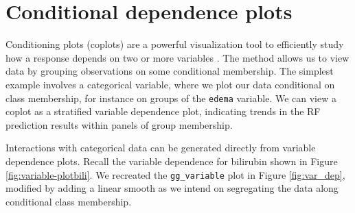 \documentclass[article]{jss}
\begin{document}
\section{Conditional dependence
plots}\label{conditional-dependence-plots}

Conditioning plots (coplots) \citep{chambers:1992,cleveland:1993} are a
powerful visualization tool to efficiently study how a response depends
on two or more variables \citep{cleveland:1993}. The method allows us to
view data by grouping observations on some conditional membership. The
simplest example involves a categorical variable, where we plot our data
conditional on class membership, for instance on groups of the
\texttt{edema} variable. We can view a coplot as a stratified variable
dependence plot, indicating trends in the RF prediction results within
panels of group membership.

Interactions with categorical data can be generated directly from
variable dependence plots. Recall the variable dependence for bilirubin
shown in Figure \ref{fig:variable-plotbili}. We recreated the
\texttt{gg\_variable} plot in Figure \ref{fig:var_dep}, modified by
adding a linear smooth as we intend on segregating the data along
conditional class membership.
\end{document}
